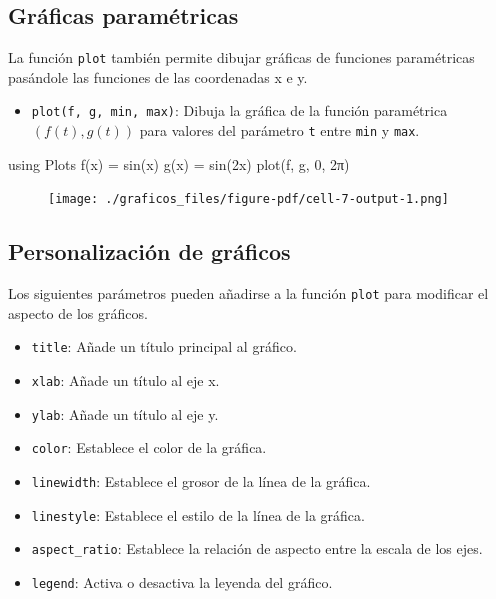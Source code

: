 \documentclass[
  letterpaper,
  DIV=11,
  numbers=noendperiod]{scrreprt}
\newenvironment{Shaded}{\begin{snugshade}}{\end{snugshade}}
\newcommand{\BuiltInTok}[1]{\textcolor[rgb]{0.00,0.23,0.31}{#1}}
\newcommand{\FloatTok}[1]{\textcolor[rgb]{0.68,0.00,0.00}{#1}}
\newcommand{\FunctionTok}[1]{\textcolor[rgb]{0.28,0.35,0.67}{#1}}
\newcommand{\ImportTok}[1]{\textcolor[rgb]{0.00,0.46,0.62}{#1}}
\newcommand{\NormalTok}[1]{\textcolor[rgb]{0.00,0.23,0.31}{#1}}
\newcommand{\OperatorTok}[1]{\textcolor[rgb]{0.37,0.37,0.37}{#1}}
\providecommand{\tightlist}{%
  \setlength{\itemsep}{0pt}\setlength{\parskip}{0pt}}\usepackage{longtable,booktabs,array}
\begin{document}
\hypertarget{gruxe1ficas-paramuxe9tricas}{%
\subsection{Gráficas paramétricas}\label{gruxe1ficas-paramuxe9tricas}}

La función \texttt{plot} también permite dibujar gráficas de funciones
paramétricas pasándole las funciones de las coordenadas x e y.

\begin{itemize}
\tightlist
\item
  \texttt{plot(f,\ g,\ min,\ max)}: Dibuja la gráfica de la función
  paramétrica \((f(t), g(t))\) para valores del parámetro \texttt{t}
  entre \texttt{min} y \texttt{max}.
\end{itemize}

\begin{Shaded}
\begin{Highlighting}[]
\ImportTok{using} \BuiltInTok{Plots}
\FunctionTok{f}\NormalTok{(x) }\OperatorTok{=} \FunctionTok{sin}\NormalTok{(x)}
\FunctionTok{g}\NormalTok{(x) }\OperatorTok{=} \FunctionTok{sin}\NormalTok{(}\FloatTok{2}\NormalTok{x)}
\FunctionTok{plot}\NormalTok{(f, g, }\FloatTok{0}\NormalTok{, }\FloatTok{2}\NormalTok{π)}
\end{Highlighting}
\end{Shaded}

\begin{figure}[H]

{\centering \texttt{[image: ./graficos\_files/figure-pdf/cell-7-output-1.png]}

}

\end{figure}

\hypertarget{personalizaciuxf3n-de-gruxe1ficos}{%
\subsection{Personalización de
gráficos}\label{personalizaciuxf3n-de-gruxe1ficos}}

Los siguientes parámetros pueden añadirse a la función \texttt{plot}
para modificar el aspecto de los gráficos.

\begin{itemize}
\tightlist
\item
  \texttt{title}: Añade un título principal al gráfico.
\item
  \texttt{xlab}: Añade un título al eje x.
\item
  \texttt{ylab}: Añade un título al eje y.
\item
  \texttt{color}: Establece el color de la gráfica.
\item
  \texttt{linewidth}: Establece el grosor de la línea de la gráfica.
\item
  \texttt{linestyle}: Establece el estilo de la línea de la gráfica.
\item
  \texttt{aspect\_ratio}: Establece la relación de aspecto entre la
  escala de los ejes.
\item
  \texttt{legend}: Activa o desactiva la leyenda del gráfico.
\end{itemize}
\end{document}
